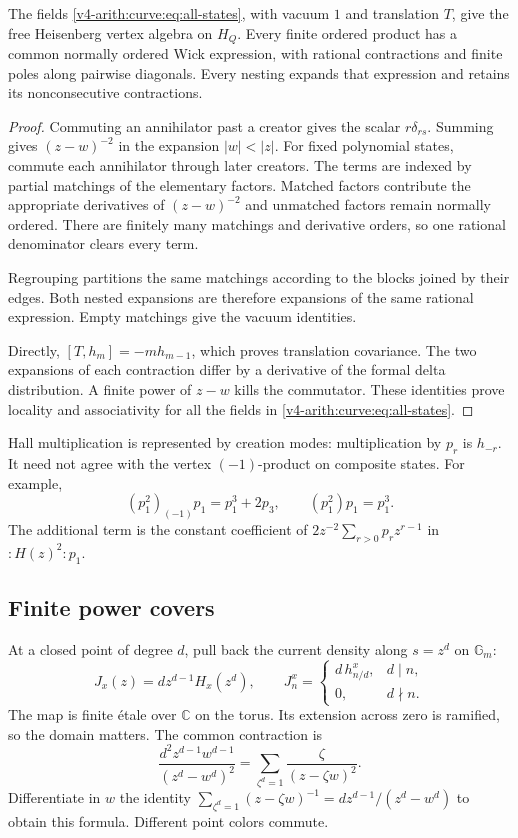 \begin{proposition}\label{v4-arith:curve:prop:wick}
The fields \eqref{v4-arith:curve:eq:all-states}, with vacuum $1$
and translation $T$, give the free Heisenberg vertex algebra on
$H_Q$. Every finite ordered product has a common normally ordered
Wick expression, with rational contractions and finite poles along
pairwise diagonals. Every nesting expands that expression and
retains its nonconsecutive contractions.
\end{proposition}
\begin{proof}
Commuting an annihilator past a creator gives the scalar
$r\delta_{rs}$. Summing gives $(z-w)^{-2}$ in the expansion
$|w|<|z|$. For fixed polynomial states, commute each annihilator
through later creators. The terms are indexed by partial matchings
of the elementary factors. Matched factors contribute the
appropriate derivatives of $(z-w)^{-2}$ and unmatched factors
remain normally ordered. There are finitely many matchings and
derivative orders, so one rational denominator clears every term.

Regrouping partitions the same matchings according to the blocks
joined by their edges. Both nested expansions are therefore
expansions of the same rational expression. Empty matchings give
the vacuum identities.

Directly,
$[T,h_m]=-mh_{m-1}$, which proves translation covariance.
The two expansions of each contraction differ by a derivative of
the formal delta distribution. A finite power of $z-w$ kills the
commutator. These identities prove locality and associativity for
all the fields in \eqref{v4-arith:curve:eq:all-states}.
\end{proof}

Hall multiplication is represented by creation modes:
multiplication by $p_r$ is $h_{-r}$. It need not agree with the
vertex $(-1)$-product on composite states. For example,
\[
 (p_1^2)_{(-1)}p_1=p_1^3+2p_3,
 \qquad (p_1^2)p_1=p_1^3.
\]
The additional term is the constant coefficient of
$2z^{-2}\sum_{r>0}p_rz^{r-1}$ in $:H(z)^2:p_1$.

\subsection{Finite power covers}

At a closed point of degree $d$, pull back the current density
along $s=z^d$ on $\mathbb G_m$:
\[
 J_x(z)=dz^{d-1}H_x(z^d),\qquad
 J^x_n=\begin{cases}d\,h^x_{n/d},&d\mid n,\\0,&d\nmid n.
 \end{cases}
\]
The map is finite \'etale over $\mathbb C$ on the torus.
Its extension across zero is ramified, so the domain matters.
The common contraction is
\begin{equation}\label{v4-arith:curve:eq:cyclotomic}
 \frac{d^2z^{d-1}w^{d-1}}{(z^d-w^d)^2}
 =\sum_{\zeta^d=1}\frac{\zeta}{(z-\zeta w)^2}.
\end{equation}
Differentiate in $w$ the identity
$\sum_{\zeta^d=1}(z-\zeta w)^{-1}
=dz^{d-1}/(z^d-w^d)$ to obtain this formula.
Different point colors commute.

